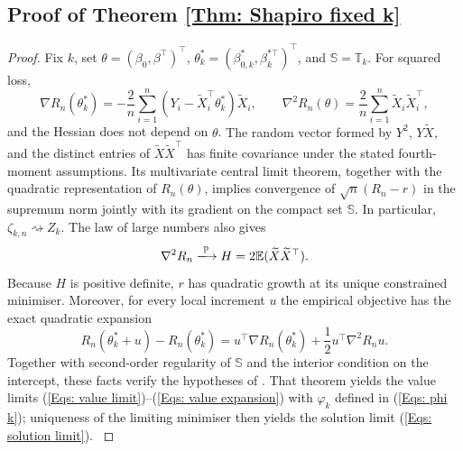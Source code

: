 \documentclass[12pt]{article}
\newenvironment{bluechange}{\begingroup\color[rgb]{0.00,0.00,1.00}}{\endgroup}
\theoremstyle{remark}
\theoremstyle{plain}
\begin{document}
\subsection{Proof of Theorem \ref{Thm: Shapiro fixed k}}
\begin{proof}
Fix $k$, set $\theta=(\beta_0,\beta^\top)^\top$, $\theta_k^*=(\beta_{0,k}^*,\beta_k^{*\top})^\top$, and $\mathbb S=\mathbb T_k$. For squared loss,
\[
\nabla R_n(\theta_k^*)=-\frac{2}{n}\sum_{i=1}^n
\left(Y_i-\widetilde X_i^\top\theta_k^*\right)\widetilde X_i,
\qquad
\nabla^2R_n(\theta)=\frac{2}{n}\sum_{i=1}^n\widetilde X_i\widetilde X_i^\top,
\]
and the Hessian does not depend on $\theta$. \begin{bluechange}
The random vector formed by $Y^2$, $Y\widetilde X$, and the distinct entries of $\widetilde X\widetilde X^\top$ has finite covariance under the stated fourth-moment assumptions. Its multivariate central limit theorem, together with the quadratic representation of $R_n(\theta)$, implies convergence of $\sqrt n(R_n-r)$ in the supremum norm jointly with its gradient on the compact set $\mathbb S$. In particular, $\zeta_{k,n}\rightsquigarrow Z_k$. The law of large numbers also gives
\[
\nabla^2R_n\xlongrightarrow{\mathbb P}H=2\mathbb E(\widetilde X\widetilde X^\top).
\]
Because $H$ is positive definite, $r$ has quadratic growth at its unique constrained minimiser. Moreover, for every local increment $u$ the empirical objective has the exact quadratic expansion
\[
R_n(\theta_k^*+u)-R_n(\theta_k^*)
=u^\top\nabla R_n(\theta_k^*)+
\frac12u^\top\nabla^2R_n u.
\]
Together with second-order regularity of $\mathbb S$ and the interior condition on the intercept, these facts verify the hypotheses of \citet[Theorem 4.4]{shapiro_statistical_2000}. That theorem yields the value limits (\ref{Eqs: value limit})--(\ref{Eqs: value expansion}) with $\varphi_k$ defined in (\ref{Eqs: phi k}); uniqueness of the limiting minimiser then yields the solution limit (\ref{Eqs: solution limit}).
\end{bluechange}
\end{proof}



\end{document}
